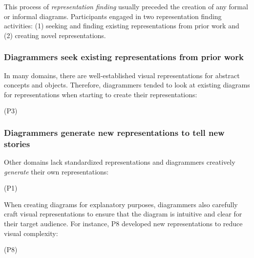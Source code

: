 This process of \textit{representation finding} usually preceded the creation of any formal or informal diagrams. Participants engaged in two representation finding activities: (1) seeking and finding existing representations from prior work and (2) creating novel representations. 

\subsubsection{Diagrammers seek existing representations from prior work}
In many domains, there are well-established visual representations for abstract concepts and objects. Therefore, diagrammers tended to look at existing diagrams for  representations when starting to create their representations:

 (P3)

\subsubsection{Diagrammers generate new representations to tell new stories} 
Other domains lack standardized representations and diagrammers creatively \textit{generate} their own representations:

     (P1)

When creating diagrams for explanatory purposes, diagrammers also carefully craft visual representations to ensure that the diagram is intuitive and clear for their target audience. For instance, P8 developed new representations to reduce visual complexity:
    
     (P8)

